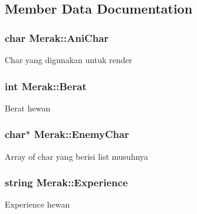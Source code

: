 \subsection{Member Data Documentation}
\subsubsection[{\texorpdfstring{Ani\+Char}{AniChar}}]{\setlength{\rightskip}{0pt plus 5cm}char Merak\+::\+Ani\+Char\hspace{0.3cm}{\ttfamily [protected]}}\hypertarget{class_merak_a06809533984c3907e6c8c517273b1ba4}{}\label{class_merak_a06809533984c3907e6c8c517273b1ba4}
Char yang digunakan untuk render 
\subsubsection[{\texorpdfstring{Berat}{Berat}}]{\setlength{\rightskip}{0pt plus 5cm}int Merak\+::\+Berat\hspace{0.3cm}{\ttfamily [protected]}}\hypertarget{class_merak_a4bb6302bfe501ef6286147ea7f003a09}{}\label{class_merak_a4bb6302bfe501ef6286147ea7f003a09}
Berat hewan 
\subsubsection[{\texorpdfstring{Enemy\+Char}{EnemyChar}}]{\setlength{\rightskip}{0pt plus 5cm}char$\ast$ Merak\+::\+Enemy\+Char\hspace{0.3cm}{\ttfamily [protected]}}\hypertarget{class_merak_aae4b84ebb17b158fd1f2c0d9a974d62a}{}\label{class_merak_aae4b84ebb17b158fd1f2c0d9a974d62a}
Array of char yang berisi list musuhnya 
\subsubsection[{\texorpdfstring{Experience}{Experience}}]{\setlength{\rightskip}{0pt plus 5cm}string Merak\+::\+Experience\hspace{0.3cm}{\ttfamily [protected]}}\hypertarget{class_merak_a6e1062918be8574174f82425620eb18b}{}\label{class_merak_a6e1062918be8574174f82425620eb18b}
Experience hewan 

